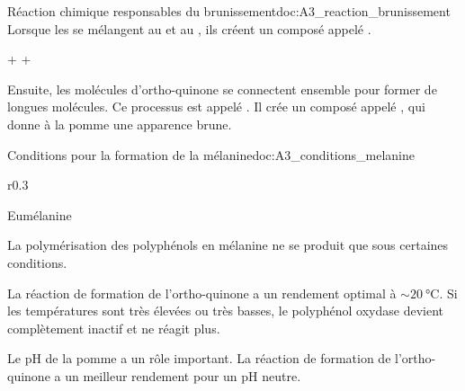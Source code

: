 


\begin{doc}{Réaction chimique responsables du brunissement}{doc:A3_reaction_brunissement}
  Lorsque les  se mélangent au  et au , ils créent un composé appelé .

  \begin{center}
     + \dioxygene + 
    \reaction
  \end{center}

  Ensuite, les molécules d'ortho-quinone se connectent ensemble pour former de longues molécules.
  Ce processus est appelé .
  Il crée un composé appelé , qui donne à la pomme une apparence brune.
\end{doc}

\begin{doc}{Conditions pour la formation de la mélanine}{doc:A3_conditions_melanine}
  \begin{wrapfigure}{r}{0.3\linewidth}
    \centering
    \vspace*{-38pt}

    Eumélanine
  \end{wrapfigure}
  La polymérisation des polyphénols en mélanine ne se produit que sous certaines conditions.
  \begin{listePoints}
    \item La réaction de formation de l'ortho-quinone a un rendement optimal à $\sim\qty{20}{\degreeCelsius}$.
    Si les températures sont très élevées ou très basses, le polyphénol oxydase devient complètement inactif et ne réagit plus.
    \item Le pH de la pomme a un rôle important. La réaction de formation de l'ortho-quinone a un meilleur rendement pour un pH neutre.
  \end{listePoints}
\end{doc}


